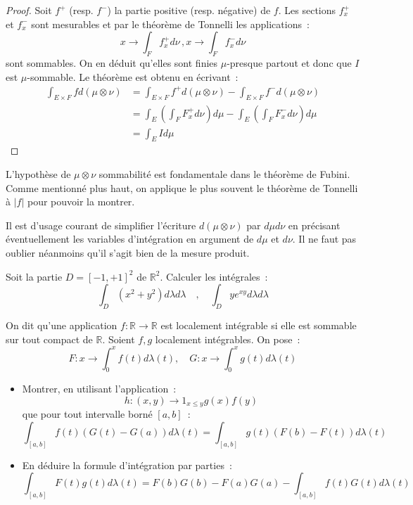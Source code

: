 \begin{proof}
Soit $f^+$ (resp. $f^-$) la partie positive (resp. négative) de
$f$. Les sections $f^+_x$ et $f^-_x$ sont mesurables et par le
théorème de Tonnelli les applications~:
\[
x \to \int_F f^+_x d \nu \, , x \to  \int_F f^-_x d \nu
\]
sont sommables. On en déduit qu'elles sont finies $\mu$-presque partout
et donc que $I$ est $\mu$-sommable. 
Le théorème est obtenu en écrivant~:
\begin{align*}
\int_{E \times F} f d (\mu \otimes \nu) & = \int_{E \times F} f^+ d( \mu
\otimes \nu) - \int_{E \times F} f^- d (\mu \otimes \nu) \\
& = \int_E \left ( \int_F F^+_x d\nu \right ) d \mu -  \int_E \left (
\int_F F^-_x d\nu \right ) d \mu \\
& = \int_E I d \mu 
\end{align*}
\end{proof}
\begin{rem}
L'hypothèse de $\mu \otimes \nu$ sommabilité est fondamentale dans le
théorème de Fubini. Comme mentionné plus haut, on applique le plus souvent le
théorème de Tonnelli à $|f|$ pour pouvoir la montrer.
\end{rem}
Il est d'usage courant de simplifier l'écriture $d(\mu \otimes \nu)$ par $d\mu
d\nu$ en précisant éventuellement les variables d'intégration en argument de
$d\mu$ et $d\nu$. Il ne faut pas oublier néanmoins qu'il s'agit bien de la mesure produit.
\begin{exercice}
Soit la partie $D=[-1,+1]^2$ de $\mathbb{R}^2$. Calculer les intégrales~:
\[
\int_{D} (x^2 +y^2) d \lambda d\lambda \quad, \quad  \int_{D} y e^{xy} d
\lambda d \lambda
\]
\end{exercice}
\begin{exercice}
On dit qu'une application $f : \mathbb{R} \to \mathbb{R}$ est
localement intégrable si elle est sommable sur tout compact de
$\mathbb{R}$. Soient $f,g$ localement intégrables. On pose~:
\[
F : x \to \int_0^x f(t) d \lambda(t) , \quad G : x \to \int_0^x g(t) d
\lambda(t)
\]
\begin{itemize}
\item Montrer, en utilisant l'application~:
\[
h : (x,y) \to 1_{x \leq y} g(x) f(y)
\]
que pour tout intervalle borné $[a,b]$~:
\[
\int_{[a,b]} f(t)(G(t) - G(a)) d\lambda(t) =
\int_{[a,b]}g(t)(F(b)-F(t)) d\lambda(t)
\]
\item En déduire la formule d'intégration par parties~:
\[
\int_{[a,b]} F(t) g(t) d \lambda(t) = F(b)G(b)-F(a)G(a) - \int_{[a,b]}
f(t) G(t) d \lambda(t)
\]
\end{itemize}
\end{exercice}

